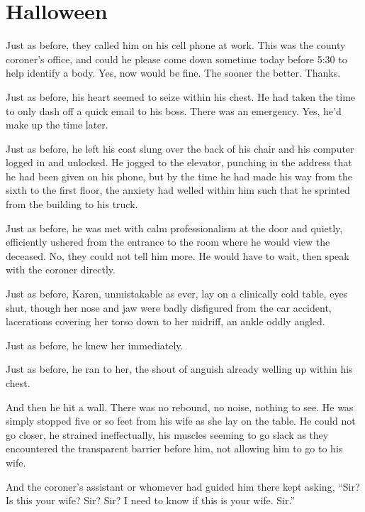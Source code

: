 \chapter{Halloween}

\begin{itshape}
  Just as before, they called him on his cell phone at work.  This was the county coroner's office, and could he please come down sometime today before 5:30 to help identify a body.  Yes, now would be fine.  The sooner the better.  Thanks.

  Just as before, his heart seemed to seize within his chest.  He had taken the time to only dash off a quick email to his boss.  There was an emergency.  Yes, he'd make up the time later.

  Just as before, he left his coat slung over the back of his chair and his computer logged in and unlocked.  He jogged to the elevator, punching in the address that he had been given on his phone, but by the time he had made his way from the sixth to the first floor, the anxiety had welled within him such that he sprinted from the building to his truck.

  Just as before, he was met with calm professionalism at the door and quietly, efficiently ushered from the entrance to the room where he would view the deceased.  No, they could not tell him more.  He would have to wait, then speak with the coroner directly.

  Just as before, Karen, unmistakable as ever, lay on a clinically cold table, eyes shut, though her nose and jaw were badly disfigured from the car accident, lacerations covering her torso down to her midriff, an ankle oddly angled.

  Just as before, he knew her immediately.

  Just as before, he ran to her, the shout of anguish already welling up within his chest.

  And then he hit a wall.  There was no rebound, no noise, nothing to see.  He was simply stopped five or so feet from his wife as she lay on the table.  He could not go closer, he strained ineffectually, his muscles seeming to go slack as they encountered the transparent barrier before him, not allowing him to go to his wife.

  And the coroner's assistant or whomever had guided him there kept asking, ``Sir?  Is this your wife?  Sir?  Sir?  I need to know if this is your wife.  Sir.''
\end{itshape}


